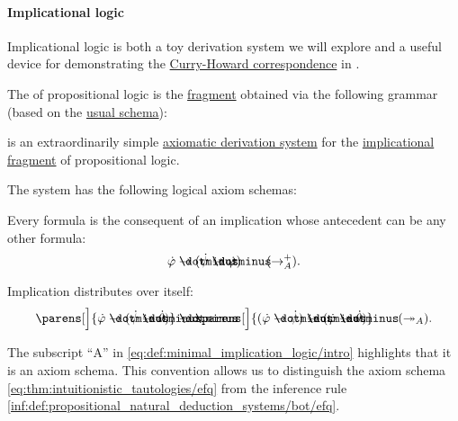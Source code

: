 \paragraph{Implicational logic}

Implicational logic is both a toy derivation system we will explore and a useful device for demonstrating the \hyperref[con:curry_howard_correspondence]{Curry-Howard correspondence} in .

\begin{definition}\label{def:implicational_propositional_fragment}
  The  of propositional logic is the \hyperref[def:propositional_syntax/fragment]{fragment} obtained via the following grammar (based on the \hyperref[def:propositional_syntax]{usual schema}):
  \begin{bnf*}
     { \bnfor \bnftsq{(} \bnfsp {} \bnfsp \bnftsq{\( \synimplies \)} \bnfsp {} \bnfsp \bnftsq{)}}
  \end{bnf*}
\end{definition}

\begin{definition}\label{def:minimal_implication_logic}
   is an extraordinarily simple \hyperref[def:axiomatic_derivation_system]{axiomatic derivation system} for the \hyperref[def:implicational_propositional_fragment]{implicational fragment} of propositional logic.

  The system has the following logical axiom schemas:
  \begin{thmenum}
     Every formula is the consequent of an implication whose antecedent can be any other formula:
    \begin{equation}\label{eq:def:minimal_implication_logic/intro}
      \syn\varphi \synimplies (\syn\psi \synimplies \syn\varphi) \tag{\( \rightarrow_A^+ \)}.
    \end{equation}

     Implication distributes over itself:
    \begin{equation}\label{eq:def:minimal_implication_logic/dist}
      \parens[\Big]{ \syn\varphi \synimplies (\syn\psi \synimplies \syn\theta) } \synimplies \parens[\Big]{ (\syn\varphi \synimplies \syn\psi) \synimplies (\syn\varphi \synimplies \syn\theta)} \tag{\( \twoheadrightarrow_A \)}.
    \end{equation}
  \end{thmenum}
\end{definition}
\begin{comments}
  \item The subscript \enquote{A} in \eqref{eq:def:minimal_implication_logic/intro} highlights that it is an axiom schema. This convention allows us to distinguish the axiom schema \eqref{eq:thm:intuitionistic_tautologies/efq} from the inference rule \ref{inf:def:propositional_natural_deduction_systems/bot/efq}.
\end{comments}

